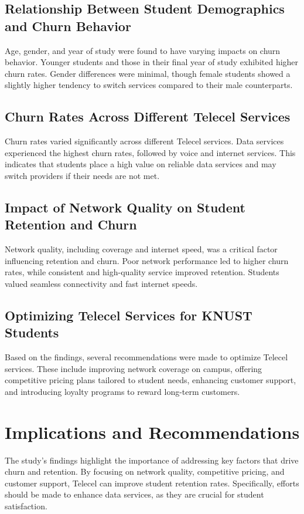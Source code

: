 \documentclass[doublespacing]{report} %
\begin{document}
\subsection{Relationship Between Student Demographics and Churn Behavior}
Age, gender, and year of study were found to have varying impacts on churn behavior. Younger students and those in their final year of study exhibited higher churn rates. Gender differences were minimal, though female students showed a slightly higher tendency to switch services compared to their male counterparts.

\subsection{Churn Rates Across Different Telecel Services}
Churn rates varied significantly across different Telecel services. Data services experienced the highest churn rates, followed by voice and internet services. This indicates that students place a high value on reliable data services and may switch providers if their needs are not met.

\subsection{Impact of Network Quality on Student Retention and Churn}
Network quality, including coverage and internet speed, was a critical factor influencing retention and churn. Poor network performance led to higher churn rates, while consistent and high-quality service improved retention. Students valued seamless connectivity and fast internet speeds.

\subsection{Optimizing Telecel Services for KNUST Students}
Based on the findings, several recommendations were made to optimize Telecel services. These include improving network coverage on campus, offering competitive pricing plans tailored to student needs, enhancing customer support, and introducing loyalty programs to reward long-term customers.

\section{Implications and Recommendations}

The study's findings highlight the importance of addressing key factors that drive churn and retention. By focusing on network quality, competitive pricing, and customer support, Telecel can improve student retention rates. Specifically, efforts should be made to enhance data services, as they are crucial for student satisfaction.
\end{document}
